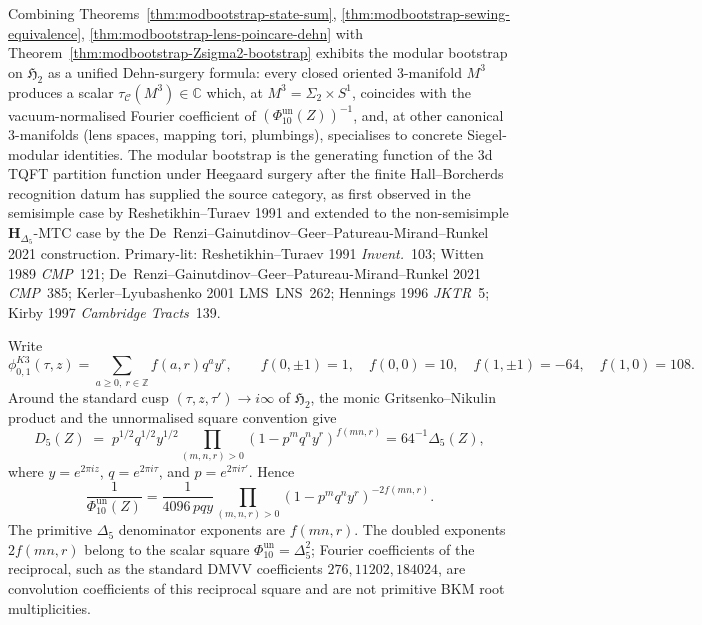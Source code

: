 \begin{remark}
\label{rem:modbootstrap-surgery-and-siegel}
Combining Theorems~\ref{thm:modbootstrap-state-sum},
\ref{thm:modbootstrap-sewing-equivalence},
\ref{thm:modbootstrap-lens-poincare-dehn} with
Theorem~\ref{thm:modbootstrap-Zsigma2-bootstrap} exhibits the
modular bootstrap on $\mathfrak H_2$ as a unified Dehn-surgery
formula: every closed oriented 3-manifold $M^3$ produces a scalar
$\tau_{\mathcal C}(M^3)\in\mathbb C$ which, at $M^3 = \Sigma_2\times
S^1$, coincides with the vacuum-normalised Fourier coefficient of
$(\Phi_{10}^{\mathrm{un}}(Z))^{-1}$, and, at other canonical 3-manifolds (lens spaces,
mapping tori, plumbings), specialises to concrete Siegel-modular
identities. The modular bootstrap is the generating function of the
3d TQFT partition function under Heegaard surgery after the finite
Hall--Borcherds recognition datum has supplied the source category, as
first observed
in the semisimple case by Reshetikhin--Turaev 1991 and extended to the
non-semisimple $\mathbf H_{\Delta_5}$-MTC case by the
De~Renzi--Gainutdinov--Geer--Patureau-Mirand--Runkel 2021 construction.
Primary-lit: Reshetikhin--Turaev 1991 \emph{Invent.}~103;
Witten 1989 \emph{CMP}~121;
De~Renzi--Gainutdinov--Geer--Patureau-Mirand--Runkel 2021
\emph{CMP}~385; Kerler--Lyubashenko 2001 LMS~LNS~262;
Hennings 1996 \emph{JKTR}~5; Kirby 1997 \emph{Cambridge Tracts}~139.
\end{remark}

\begin{theorem}
\label{thm:modbootstrap-genus2-fourier-dictionary}
Write
\[
 \phi_{0,1}^{K3}(\tau,z)=\sum_{a\geq0,\ r\in\mathbb Z}f(a,r)q^a y^r,
 \qquad
 f(0,\pm1)=1,\quad f(0,0)=10,\quad
 f(1,\pm1)=-64,\quad f(1,0)=108 .
\]
Around the standard cusp
$(\tau,z,\tau')\to i\infty$ of $\mathfrak H_2$, the monic
Gritsenko--Nikulin product and the unnormalised square convention give
\[
 D_5(Z)
 \;=\;
 p^{1/2}q^{1/2}y^{1/2}
 \prod_{(m,n,r)>0}(1-p^m q^n y^r)^{f(mn,r)}
 =64^{-1}\Delta_5(Z),
\]
where $y=e^{2\pi iz}$, $q=e^{2\pi i\tau}$, and
$p=e^{2\pi i\tau'}$.  Hence
\[
 \frac{1}{\Phi_{10}^{\mathrm{un}}(Z)}
 =
 \frac{1}{4096\,p q y}
 \prod_{(m,n,r)>0}(1-p^m q^n y^r)^{-2f(mn,r)} .
\]
The primitive $\Delta_5$ denominator exponents are $f(mn,r)$.  The
doubled exponents $2f(mn,r)$ belong to the scalar square
$\Phi_{10}^{\mathrm{un}}=\Delta_5^2$; Fourier coefficients of the
reciprocal, such as the standard DMVV coefficients
$276,11202,184024$, are convolution coefficients of this reciprocal
square and are not primitive BKM root multiplicities.
\end{theorem}

